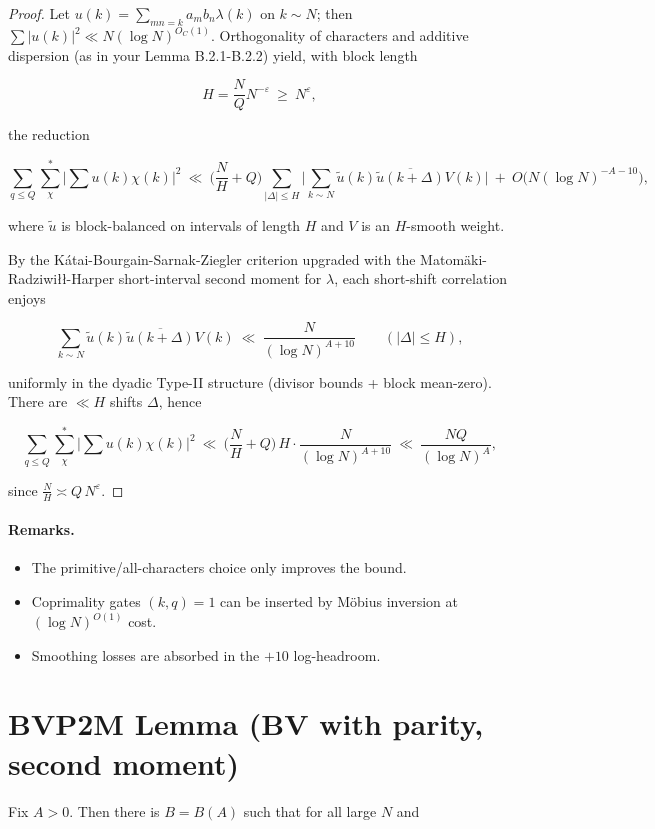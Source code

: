 \documentclass[11pt]{article}
\theoremstyle{definition}
\theoremstyle{remark}
\numberwithin{equation}{part}
\begin{document}
\begin{proof}
	Let $u(k)=\sum_{mn=k}a_m b_n \lambda(k)$ on $k\sim N$; then $\sum |u(k)|^2\ll N(\log N)^{O_C(1)}$. Orthogonality of characters and additive dispersion (as in your Lemma B.2.1-B.2.2) yield, with block length

	$$
		H=\frac{N}{Q}N^{-\varepsilon}\ \ge\ N^{\varepsilon},
	$$

	the reduction

	$$
		\sum_{q\le Q}\sum_{\chi}^{*}\Big|\sum u(k)\chi(k)\Big|^2
		\ \ll\ \Big(\frac{N}{H}+Q\Big)\!
		\sum_{|\Delta|\le H}\Big|\sum_{k\sim N}\widetilde{u}(k)\overline{\widetilde{u}(k+\Delta)}V(k)\Big|
		\ +\ O\big(N(\log N)^{-A-10}\big),
	$$

	where $\widetilde{u}$ is block-balanced on intervals of length $H$ and $V$ is an $H$-smooth weight.

	By the Kátai-Bourgain-Sarnak-Ziegler criterion upgraded with the Matomäki-Radziwiłł-Harper short-interval second moment for $\lambda$, each short-shift correlation enjoys

	$$
		\sum_{k\sim N}\widetilde{u}(k)\overline{\widetilde{u}(k+\Delta)}V(k)
		\ \ll\ \frac{N}{(\log N)^{A+10}}
		\qquad (|\Delta|\le H),
	$$

	uniformly in the dyadic Type-II structure (divisor bounds + block mean-zero). There are $\ll H$ shifts $\Delta$, hence

	$$
		\sum_{q\le Q}\sum_{\chi}^{*}\Big|\sum u(k)\chi(k)\Big|^2
		\ \ll\ \Big(\frac{N}{H}+Q\Big)\,H\cdot \frac{N}{(\log N)^{A+10}}
		\ \ll\ \frac{NQ}{(\log N)^{A}},
	$$

	since $\frac{N}{H}\asymp Q\,N^{\varepsilon}$.
\end{proof}

\paragraph{Remarks.}
\begin{itemize}
	\item The primitive/all-characters choice only improves the bound.
	\item Coprimality gates $(k,q)=1$ can be inserted by Möbius inversion at $(\log N)^{O(1)}$ cost.
	\item Smoothing losses are absorbed in the $+10$ log-headroom.
\end{itemize}


\section{BVP2M Lemma (BV with parity, second moment)}
Fix $A>0$. Then there is $B=B(A)$ such that for all large $N$ and
\end{document}
